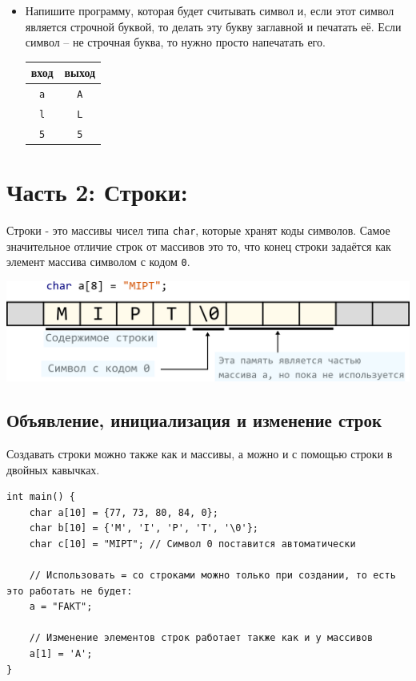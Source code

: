 \documentclass{article}
\begin{document}
\begin{itemize}
\item Напишите программу, которая будет считывать символ и, если этот символ является строчной буквой, то делать эту букву заглавной и печатать её. Если символ -- не строчная буква, то нужно просто напечатать его.
\begin{center}
\begin{tabular}{ c | c }
 вход & выход \\ \hline
 \texttt{a} & \texttt{A}  \\ 
 \texttt{l} & \texttt{L}  \\ 
 \texttt{5} & \texttt{5}  \\ 
\end{tabular}
\end{center}
\end{itemize}
\newpage
\section*{Часть 2: Строки:}
Строки - это массивы чисел типа \texttt{char}, которые хранят коды символов. Самое значительное отличие строк от массивов это то, что конец строки задаётся как элемент массива символом с кодом \texttt{0}. 

\begin{center}
\includegraphics[scale=0.75]{../images/string_in_memory.png}
\end{center}

\subsection*{Объявление, инициализация и изменение строк}
Создавать строки можно также как и массивы, а можно и с помощью строки в двойных кавычках.
\begin{lstlisting}
int main() {
    char a[10] = {77, 73, 80, 84, 0};
    char b[10] = {'M', 'I', 'P', 'T', '\0'};
    char c[10] = "MIPT"; // Символ 0 поставится автоматически
	
    // Использовать = со строками можно только при создании, то есть это работать не будет:
    a = "FAKT";
    
    // Изменение элементов строк работает также как и у массивов
    a[1] = 'A';
}
\end{lstlisting}
\end{document}
